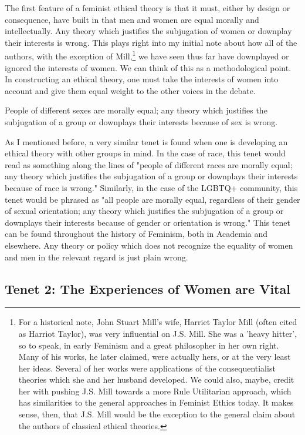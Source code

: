 The first feature of a feminist ethical theory is that it must, either by design or consequence, have built in that men and women are equal morally and intellectually. Any theory which justifies the subjugation of women or downplay their interests is wrong. This plays right into my initial note about how all of the authors, with the exception of Mill,\footnote{For a historical note, John Stuart Mill's wife, Harriet Taylor Mill (often cited as Harriot Taylor), was very influential on J.S. Mill. She was a 'heavy hitter', so to speak, in early Feminism and a great philosopher in her own right. Many of his works, he later claimed, were actually hers, or at the very least her ideas. Several of her works were applications of the consequentialist theories which she and her husband developed. We could also, maybe, credit her with pushing J.S. Mill towards a more Rule Utilitarian approach, which has similarities to the general approaches in Feminist Ethics today. It makes sense, then, that J.S. Mill would be the exception to the general claim about the authors of classical ethical theories.} we have seen thus far have downplayed or ignored the interests of women. We can think of this as a methodological point. In constructing an ethical theory, one must take the interests of women into account and give them equal weight to the other voices in the debate.
\begin{center}
People of different sexes are morally equal; any theory which justifies the subjugation of a group or downplays their interests because of sex is wrong.
\end{center}
As I mentioned before, a very similar tenet is found when one is developing an ethical theory with other groups in mind. In the case of race, this tenet would read as something along the lines of "people of different races are morally equal; any theory which justifies the subjugation of a group or downplays their interests because of race is wrong." Similarly, in the case of the LGBTQ+ community, this tenet would be phrased as "all people are morally equal, regardless of their gender of sexual orientation; any theory which justifies the subjugation of a group or downplays their interests because of gender or orientation is wrong." This tenet can be found throughout the history of Feminism, both in Academia and elsewhere. Any theory or policy which does not recognize the equality of women and men in the relevant regard is just plain wrong. 

\subsection{Tenet 2: The Experiences of Women are Vital}

